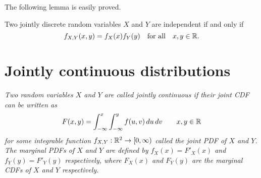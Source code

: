 The following lemma is easily proved.
\begin{lemma}
Two jointly discrete random variables $X$ and $Y$ are independent if and only if 
\[
f_{X,Y}(x,y) =f_X(x) f_Y(y)\quad\text{for all}\quad x,y\in\mathbb{R}.
\]
\end{lemma}
%

\section{Jointly continuous distributions}
\begin{definition}
\ben
\it
Two random variables $X$ and $Y$ are called \emph{jointly continuous} if their joint CDF can be written as
\[
F(x,y) = \int_{-\infty}^x\int_{-\infty}^y f(u,v)\,du\,dv \text{\qquad} x,y\in\mathbb{R}
\]
for some integrable function $f_{X,Y}:\mathbb{R}^2\to[0,\infty)$ called the \emph{joint PDF} of $X$ and $Y$.
\it
The \emph{marginal PDFs} of $X$ and $Y$ are defined by $f_X(x)=F'_X(x)$ and $f_Y(y)=F'_Y(y)$ respectively, where $F_X(x)$ and $F_Y(y)$ are the marginal CDFs of $X$ and $Y$ respectively.
\een
\end{definition}

